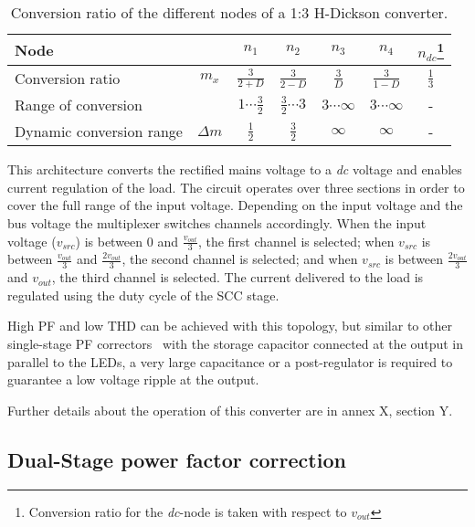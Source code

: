 \begin{table}[h]
\centering
\caption{Conversion ratio of the different nodes of a 1:3 H-Dickson converter.}
\label{tab:1:3 H-Dick_M}
\renewcommand{\arraystretch}{1.5}%
\begin{tabular}{l  c | c c c c c }
 Node &  & $n_1$ & $n_2$ & $n_3$ & $n_4$ & $n_{dc}$\footnote{Conversion ratio for the \emph{dc}-node is taken with respect to $v_{out}$} \\
 \midrule
 Conversion ratio & $m_x$ & $\frac{3}{2+D} $    & $\frac{3}{2-D} $ & $\frac{3}{D} $ & $\frac{3}{1-D} $ & $\frac{1}{3}$ \\
 Range of conversion &       & $1 \cdots \frac{3}{2}$ & $\frac{3}{2} \cdots 3 $ & $3 \cdots \infty $ & $ 3 \cdots \infty $ & - \\
 Dynamic conversion range & $\Delta m$ &  $\frac{1}{2}$ &  $\frac{3}{2}$ &  $\infty$ &  $\infty$ &  -
\end{tabular}
\end{table}

This architecture converts the rectified mains voltage to a \emph{dc} voltage and enables current regulation of the load. The circuit operates over three sections in order to cover the full range of the input voltage.  Depending on the input voltage and the bus voltage the multiplexer switches channels accordingly. When the input voltage ($v_{src}$) is between $0$  and $ \frac{v_{out}}{3}$, the first channel is selected; when $v_{src}$ is between $\frac{v_{out}}{3}$ and $\frac{2 v_{out}}{3}$, the second channel is selected; and when $v_{src}$ is between $\frac{2 v_{out}}{3}$ and $v_{out}$, the third channel is selected. The current delivered to the load is regulated using the duty cycle of the SCC stage.

High PF and low THD can be achieved with this topology, but similar to other single-stage PF correctors~\cite{1991Kheraluwala,2003AND8124D,2009Yuequan,2012Yuequan} with the storage capacitor connected at the output in parallel to the LEDs, a very large capacitance or a post-regulator is required to guarantee a low voltage ripple at the output.

Further details about the operation of this converter are in annex X, section Y.

\subsection[Dual-Stage PFC]{Dual-Stage power factor correction }

